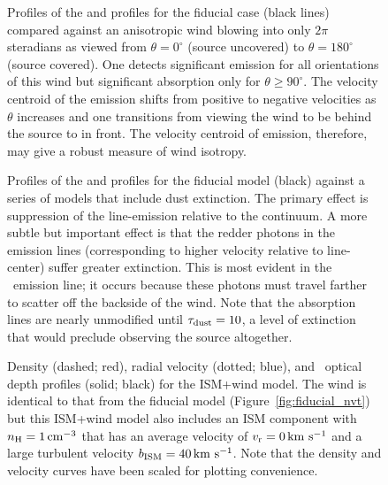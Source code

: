 \documentclass[12pt,preprint]{aastex}
\begin{document}
\begin{figure}
\caption{
Profiles of the  and  profiles for the fiducial
case (black lines) compared against an anisotropic wind blowing into
only $2\pi$ steradians as viewed from $\theta = 0^\circ$ (source
uncovered) to $\theta = 180^\circ$ (source covered).  One detects
significant emission for all orientations of this wind but significant
absorption only for $\theta \ge 90^\circ$.
The velocity centroid of the 
emission shifts from positive to negative velocities as $\theta$
increases and one transitions from viewing the wind to be behind the
source to in front.  The velocity centroid of emission, therefore, may
give a robust measure of wind isotropy.
}
\label{fig:anisotropic}
\end{figure}

\begin{figure}
\caption{
Profiles of the  and  profiles for the fiducial
model (black) against a series of models that include 
dust extinction.  The primary effect is suppression of
the line-emission relative to the continuum. 
A more subtle but important effect is that the redder photons in the
emission lines (corresponding to higher velocity relative to
line-center) suffer greater extinction.  This is most evident in the
\feiic\ emission line; it occurs because these photons must
travel farther to scatter off the backside of the wind.  Note that
the absorption lines are nearly unmodified until $\tau_{\rm dust} = 10$, a
level of extinction that would preclude observing the source
altogether.
}
\label{fig:dust}
\end{figure}

\begin{figure}
\caption{
Density (dashed; red), radial velocity (dotted; blue), and
\mgiia\ optical depth profiles (solid; black) for the ISM+wind
model.  The wind is identical to that from the fiducial model
(Figure~\ref{fig:fiducial_nvt}) but this ISM+wind model also includes an ISM component
with $n_{\rm H} = 1 \, {\rm cm^{-3}}$ that has an average velocity of $v_{\rm r} = 0
\, {\rm km~s^{-1}}$ and a large turbulent velocity $b_{\rm ISM} = 40 \, {\rm km~s^{-1}}$.
Note that the density and velocity curves have been scaled for plotting
convenience.  
}
\label{fig:ISM}
\end{figure}
\end{document}
